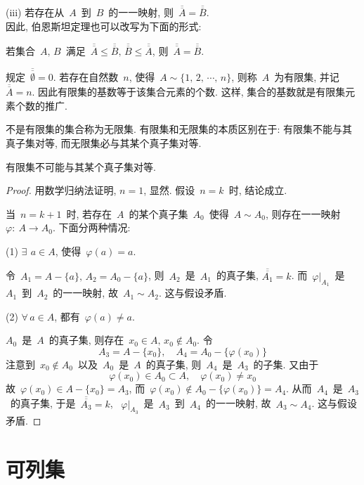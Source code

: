 (iii) 若存在从~$A$~到~$B$~的一一映射, 则~$\overline{\overline A} = \overline{\overline B}$. \\
\noindent 因此, 伯恩斯坦定理也可以改写为下面的形式:

\begin{theorem}
若集合~$A,\,B$~满足~$\overline{\overline A} \leqslant \overline{\overline B}, \, \overline{\overline B} \leqslant \overline{\overline A}$, 则~$\overline{\overline A} = \overline{\overline B}$.
\end{theorem}

规定~$\overline{\overline{\emptyset}} = 0$. 若存在自然数~$n$, 使得~$A \sim \{1,\,2,\,\cdots, \, n\}$, 则称~$A$~为有限集, 并记~$\overline{\overline A} = n$. 因此有限集的基数等于该集合元素的个数. 这样,  集合的基数就是有限集元素个数的推广.

不是有限集的集合称为无限集. 有限集和无限集的本质区别在于: 有限集不能与其真子集对等,
而无限集必与其某个真子集对等.

\begin{theorem} \label{thm1.2.2}
有限集不可能与其某个真子集对等.
\end{theorem}

\begin{proof}
用数学归纳法证明, $n = 1$, 显然. 假设~$n = k$~时, 结论成立.

当~$n = k + 1$~时, 若存在~$A$~的某个真子集~$A_0$~使得~$A \sim A_0$, 则存在一一映射~$\varphi: \: A \rightarrow A_0$. 下面分两种情况:

(1) $\exists \, \ a \in A$, 使得~$\varphi(a) = a$.

令~$A_1 = A - \{a\}, \, A_2 = A_0 - \{a\}$, 则~$A_2$~是~$A_1$~的真子集, $\overline{\overline {A_1}} = k$. 而~$\varphi|_{A_1}$~是~$A_1$~到~$A_2$~的一一映射, 故~$A_1 \sim A_2$. 这与假设矛盾.

(2) $\forall \, a \in A$, 都有~$\varphi(a) \neq a$.

$A_0$~是~$A$~的真子集, 则存在~$x_0 \in A, \, x_0 \notin A_0$. 令
\[
A_3 = A - \{x_0\}, \quad A_4 = A_0 - \{\varphi(x_0)\}
\]
注意到~$x_0 \notin A_0$~以及~$A_0$~是~$A$~的真子集, 则~$A_4$~是~$A_3$~的子集. 又由于
\[
\varphi(x_0) \in A_0 \subset A, \quad \varphi(x_0) \neq x_0
\]
故~$\varphi(x_0) \in A - \{x_0\} = A_3$, 而~$\varphi(x_0) \notin A_0 - \{\varphi(x_0)\} = A_4$. 从而~$A_4$~是~$A_3$~的真子集,  于是~$\overline{\overline {A_3}} = k$, ~$\varphi|_{A_3}$~是~$A_3$~到~$A_4$~的一一映射, 故~$A_3 \sim A_4$. 这与假设矛盾.
\end{proof}

\section{可列集}

